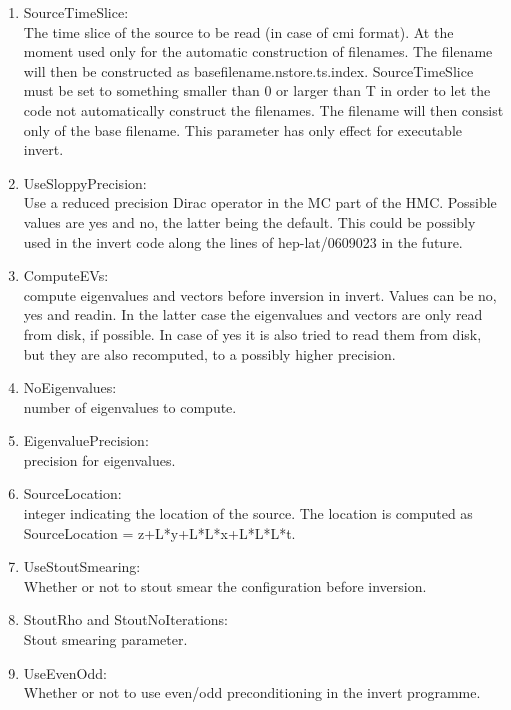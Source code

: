 \begin{enumerate}
\item {\ttfamily SourceTimeSlice}:\\
  The time slice of the source to be read (in case of cmi format). At
  the moment used only for
  the automatic construction of filenames. The filename will then be
  constructed as {\ttfamily basefilename.nstore.ts.index}.
  {\ttfamily SourceTimeSlice} must be set to something
  smaller than 0 or larger than T in order to let the code not
  automatically construct the filenames. The filename will then
  consist only of the base filename. This parameter has only
  effect for executable {\ttfamily invert}.

\item {\ttfamily UseSloppyPrecision}:\\
  Use a reduced precision Dirac operator in the MC part of the
  HMC. Possible values are yes and no, the latter being the
  default. This could be possibly used in the invert code along the 
  lines of {\ttfamily hep-lat/0609023} in the future.

\item {\ttfamily ComputeEVs}:\\
  compute eigenvalues and vectors before inversion in invert. Values
  can be no, yes and readin. In the latter case the eigenvalues and
  vectors are only read from disk, if possible. In case of yes it is
  also tried to read them from disk, but they are also recomputed, to
  a possibly higher precision.

\item {\ttfamily NoEigenvalues}:\\
  number of eigenvalues to compute.

\item {\ttfamily EigenvaluePrecision}:\\
  precision for eigenvalues.

\item {\ttfamily SourceLocation}:\\
  integer indicating the location of the source. The location is computed as
  {\ttfamily SourceLocation = z+L*y+L*L*x+L*L*L*t}.

\item {\ttfamily UseStoutSmearing}:\\
  Whether or not to stout smear the configuration before inversion.

\item {\ttfamily StoutRho} and {\ttfamily StoutNoIterations}:\\
  Stout smearing parameter.

\item {\gg\ttfamily UseEvenOdd}:\\
  Whether or not to use even/odd preconditioning in the invert
  programme.
  
\end{enumerate}

